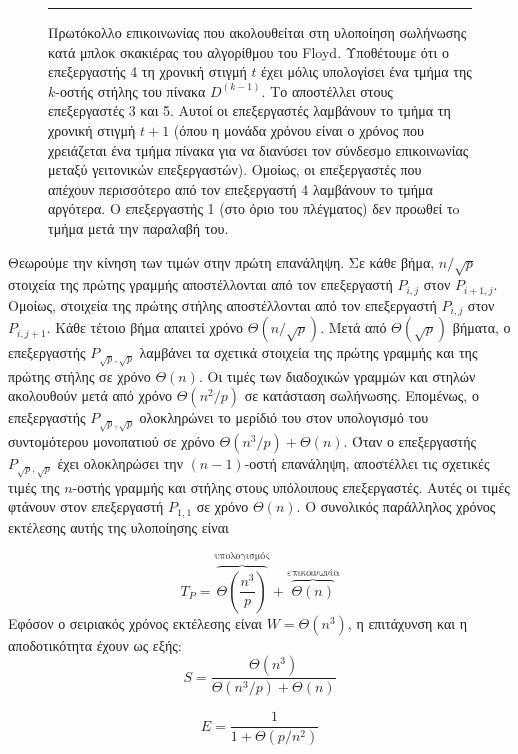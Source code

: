 \documentclass[12pt,a4paper]{article} %
\begin{document}
{{\begin{figure}[H]
\begin{tikzpicture}[
    node distance=1.1cm,
    proc/.style={circle, draw, minimum size=0.7cm, inner sep=0pt}
]
\end{tikzpicture}
\vspace{0.3cm}
\noindent\rule{\textwidth}{0.2pt}
\caption{Πρωτόκολλο επικοινωνίας που ακολουθείται στη υλοποίηση σωλήνωσης κατά μπλοκ σκακιέρας του αλγορίθμου του Floyd. Υποθέτουμε ότι ο επεξεργαστής 4 τη χρονική στιγμή $t$ έχει μόλις υπολογίσει ένα τμήμα της $k$-οστής στήλης του πίνακα $D^{(k-1)}$. Το αποστέλλει στους επεξεργαστές 3 και 5. Αυτοί οι επεξεργαστές λαμβάνουν το τμήμα τη χρονική στιγμή $t+1$ (όπου η μονάδα χρόνου είναι ο χρόνος που χρειάζεται ένα τμήμα πίνακα για να διανύσει τον σύνδεσμο επικοινωνίας μεταξύ γειτονικών επεξεργαστών). Ομοίως, οι επεξεργαστές που απέχουν περισσότερο από τον επεξεργαστή 4 λαμβάνουν το τμήμα αργότερα. Ο επεξεργαστής 1 (στο όριο του πλέγματος) δεν προωθεί τo τμήμα μετά την παραλαβή του.}
\label{fig:graph11}
\end{figure}

Θεωρούμε την κίνηση των τιμών στην πρώτη επανάληψη. Σε κάθε βήμα, $n/\sqrt{p}$ στοιχεία της πρώτης γραμμής αποστέλλονται από τον επεξεργαστή $P_{i,j}$ στον $P_{i+1,j}$. Ομοίως, στοιχεία της πρώτης στήλης αποστέλλονται από τον επεξεργαστή $P_{i,j}$ στον $P_{i,j+1}$. Κάθε τέτοιο βήμα απαιτεί χρόνο $\Theta(n/\sqrt{p})$. Μετά από $\Theta(\sqrt{p})$ βήματα, ο επεξεργαστής $P_{\sqrt{p},\sqrt{p}}$ λαμβάνει τα σχετικά στοιχεία της πρώτης γραμμής και της πρώτης στήλης σε χρόνο $\Theta(n)$. Οι τιμές των διαδοχικών γραμμών και στηλών ακολουθούν μετά από χρόνο $\Theta(n^2/p)$ σε κατάσταση σωλήνωσης. Επομένως, ο επεξεργαστής $P_{\sqrt{p},\sqrt{p}}$ ολοκληρώνει το μερίδιό του στον υπολογισμό του συντομότερου μονοπατιού σε χρόνο $\Theta(n^3/p) + \Theta(n)$. Όταν ο επεξεργαστής $P_{\sqrt{p},\sqrt{p}}$ έχει ολοκληρώσει την $(n-1)$-οστή επανάληψη, αποστέλλει τις σχετικές τιμές της $n$-οστής γραμμής και στήλης στους υπόλοιπους επεξεργαστές. Αυτές οι τιμές φτάνουν στον επεξεργαστή $P_{1,1}$ σε χρόνο $\Theta(n)$. Ο συνολικός παράλληλος χρόνος εκτέλεσης αυτής της υλοποίησης είναι

\[
T_P = \overbrace{\Theta\left(\frac{n^3}{p}\right)}^{\text{υπολογισμός}} + \overbrace{\Theta(n)}^{\text{επικοινωνία}}
\]
Εφόσον ο σειριακός χρόνος εκτέλεσης είναι $W = \Theta(n^3)$, η επιτάχυνση και η αποδοτικότητα έχουν ως εξής:
\[
S = \frac{\Theta(n^3)}{\Theta(n^3/p) + \Theta(n)}
\]

\begin{equation}
E = \frac{1}{1 + \Theta(p/n^2)}
\label{eq:relation10}
\end{equation}

}}
\end{document}
